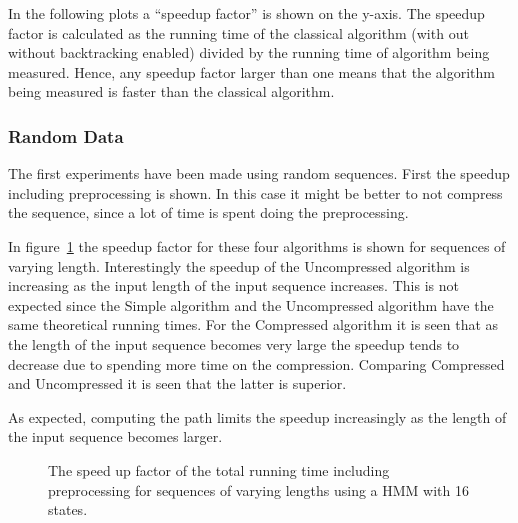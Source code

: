 In the following plots a ``speedup factor'' is shown on the y-axis. The speedup
factor is calculated as the running time of the classical algorithm (with out
without backtracking enabled) divided by the running time of algorithm being
measured. Hence, any speedup factor larger than one means that the algorithm
being measured is faster than the classical algorithm.

%   

\subsubsection{Random Data}

The first experiments have been made using random sequences. First the speedup
including preprocessing is shown. In this case it might be better to not
compress the sequence, since a lot of time is spent doing the
preprocessing.

In figure~\ref{fig:speedup_vs_sequence_length} the speedup factor for these
four algorithms is shown for sequences of varying length. Interestingly the
speedup of the Uncompressed algorithm is increasing as the input length of the
input sequence increases. This is not expected since the Simple algorithm and
the Uncompressed algorithm have the same theoretical running times. For the
Compressed algorithm it is seen that as the length of the input sequence
becomes very large the speedup tends to decrease due to spending more time on
the compression.  Comparing Compressed and Uncompressed it is seen that the latter
is superior.

As expected, computing the path limits the speedup increasingly as the length
of the input sequence becomes larger. 

\begin{figure}
  \centering
  
  \caption{The speed up factor of the total running time including preprocessing
    for sequences of varying lengths using a HMM with 16 states.}
  \label{fig:speedup_vs_sequence_length}
\end{figure}

